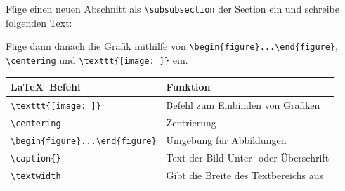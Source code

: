 \documentclass["WS\space 16-17\space -\space LaTeX-Kurs\space -\space Praesentation\space -\space 2.tex"]{subfiles}
\begin{document}
\begin{frame}[fragile]
	\begin{Aufgabe}
		Füge einen neuen Abschnitt \textrm{} als \lstinline[basicstyle=\normalfont\ttfamily\normalsize]|\subsubsection| der Section \textrm{} ein und schreibe folgenden Text:
		
		\textrm{}
		
		Füge dann danach die Grafik  mithilfe von \lstinline[basicstyle=\normalfont\ttfamily\normalsize]|\begin{figure}...\end{figure}|, \lstinline[basicstyle=\normalfont\ttfamily\normalsize]|\centering| und \lstinline[basicstyle=\normalfont\ttfamily\normalsize]|\texttt{[image: ]}| ein.
	\end{Aufgabe}

	\btVFill\Befehle
	\begin{center}
		\begin{tabular}{ll}
			\toprule
			\LaTeX\ Befehl								&	Funktion								\\ \midrule
			\lstinline|\texttt{[image: ]}|			&	Befehl zum Einbinden von Grafiken		\\ 
			\lstinline|\centering|						&	Zentrierung								\\
			\lstinline|\begin{figure}...\end{figure}|	&	Umgebung für Abbildungen				\\
			\lstinline|\caption{}|						&	Text der Bild Unter- oder Überschrift	\\
			\lstinline|\textwidth|						&	Gibt die Breite des Textbereichs aus	\\
			\bottomrule
		\end{tabular}
	\end{center}
\end{frame}
\end{document}
